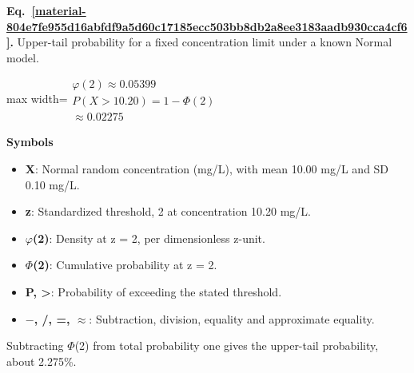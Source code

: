 \documentclass[11pt,a4paper]{article}
\begin{document}
\par\medskip
\begin{samepage}
\label{material-804e7fe955d16abfdf9a5d60c17185ecc503bb8db2a8ee3183aadb930cca4cf6}
\noindent\textbf{Eq.~\ref*{material-804e7fe955d16abfdf9a5d60c17185ecc503bb8db2a8ee3183aadb930cca4cf6}.} Upper-tail probability for a fixed concentration limit under a known Normal model.\par\nopagebreak
\begin{center}\begin{adjustbox}{max width=\linewidth}$\displaystyle \begin{gathered}\varphi(2)\approx0.05399\\P(X>10.20)=1-\Phi(2)\\\approx0.02275\end{gathered}$\end{adjustbox}\end{center}

\par\noindent\textbf{Symbols}

\begin{itemize}\setlength{\itemsep}{1pt}\setlength{\parsep}{0pt}
\item \textbf{X}: Normal random concentration (mg/L), with mean 10.00 mg/L and SD 0.10 mg/L.
\item \textbf{z}: Standardized threshold, 2 at concentration 10.20 mg/L.
\item \textbf{\ensuremath{\varphi}(2)}: Density at z = 2, per dimensionless z-unit.
\item \textbf{\ensuremath{\Phi}(2)}: Cumulative probability at z = 2.
\item \textbf{P, >}: Probability of exceeding the stated threshold.
\item \textbf{\ensuremath{-}, /, =, \ensuremath{\approx}}: Subtraction, division, equality and approximate equality.
\end{itemize}

Subtracting \ensuremath{\Phi}(2) from total probability one gives the upper-tail probability, about 2.275\%.

\end{samepage}
\medskip
\end{document}
